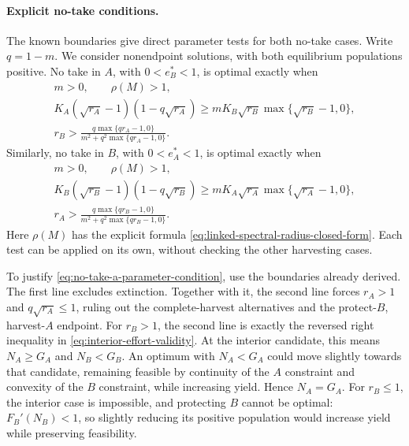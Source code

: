 \documentclass{article}
\numberwithin{equation}{section}
\begin{document}
\paragraph{Explicit no-take conditions.}
The known boundaries give direct parameter tests for both no-take cases.
Write $q=1-m$. We consider nonendpoint solutions, with both equilibrium
populations positive. No take in $A$, with $0<e_B^*<1$, is optimal exactly when
\begin{equation}
    \label{eq:no-take-a-parameter-condition}
    \begin{gathered}
    m>0,\qquad \rho(M)>1,\\[2pt]
    K_A(\sqrt{r_A}-1)(1-q\sqrt{r_A})
    \geq mK_B\sqrt{r_B}\max\{\sqrt{r_B}-1,0\},\\[4pt]
    r_B>\frac{q\max\{qr_A-1,0\}}
                  {m^2+q^2\max\{qr_A-1,0\}}.
    \end{gathered}
\end{equation}
Similarly, no take in $B$, with $0<e_A^*<1$, is optimal exactly when
\begin{equation}
    \label{eq:no-take-b-parameter-condition}
    \begin{gathered}
    m>0,\qquad \rho(M)>1,\\[2pt]
    K_B(\sqrt{r_B}-1)(1-q\sqrt{r_B})
    \geq mK_A\sqrt{r_A}\max\{\sqrt{r_A}-1,0\},\\[4pt]
    r_A>\frac{q\max\{qr_B-1,0\}}
                  {m^2+q^2\max\{qr_B-1,0\}}.
    \end{gathered}
\end{equation}
Here $\rho(M)$ has the explicit formula
\eqref{eq:linked-spectral-radius-closed-form}. Each test can be applied
on its own, without checking the other harvesting cases.

\smallskip
To justify \eqref{eq:no-take-a-parameter-condition}, use the boundaries
already derived. The first line excludes extinction. Together with it,
the second line forces $r_A>1$ and $q\sqrt{r_A}\leq1$, ruling out the
complete-harvest alternatives and the protect-$B$, harvest-$A$ endpoint.
For $r_B>1$, the second line is exactly the reversed right inequality
in \eqref{eq:interior-effort-validity}. At the interior candidate,
this means $N_A\geq G_A$ and $N_B<G_B$.
An optimum with $N_A<G_A$ could move slightly towards that candidate,
remaining feasible by continuity of the $A$ constraint and convexity of
the $B$ constraint, while increasing yield. Hence $N_A=G_A$.
For $r_B\leq1$, the interior case is impossible, and protecting $B$
cannot be optimal: $F_B'(N_B)<1$, so slightly reducing its positive
population would increase yield while preserving feasibility.
\end{document}
